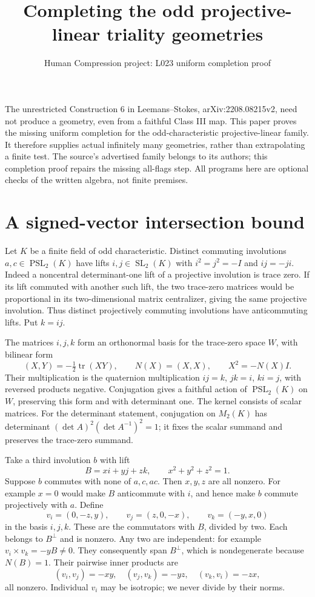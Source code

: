 \documentclass[11pt,a4paper]{article}
\title{Completing the odd projective-linear triality geometries}
\author{Human Compression project: L023 uniform completion proof}\date{}
\newcommand{\PSL}{\operatorname{PSL}}
\begin{document}
\maketitle
The unrestricted Construction 6 in Leemans--Stokes,
arXiv:2208.08215v2, need not produce a geometry, even from a faithful
Class III map. This paper proves the missing uniform completion for
the odd-characteristic projective-linear family. It therefore supplies
actual infinitely many geometries, rather than extrapolating a finite
test. The source's advertised family belongs to its authors; this
completion proof repairs the missing all-flags step. All programs here
are optional checks of the written algebra, not finite premises.

\section{A signed-vector intersection bound}
Let $K$ be a finite field of odd characteristic. Distinct commuting
involutions $a,c\in\PSL_2(K)$ have lifts $i,j\in\operatorname{SL}_2(K)$
with $i^2=j^2=-I$ and $ij=-ji$. Indeed a noncentral determinant-one
lift of a projective involution is trace zero. If its lift commuted
with another such lift, the two trace-zero matrices would be
proportional in its two-dimensional matrix centralizer, giving the
same projective involution. Thus distinct projectively commuting
involutions have anticommuting lifts. Put $k=ij$.

The matrices $i,j,k$ form an orthonormal basis for the trace-zero
space $W$, with bilinear form
\[
 (X,Y)=-\tfrac12\operatorname{tr}(XY),\qquad
 N(X)=(X,X),\qquad X^2=-N(X)I.
\]
Their multiplication is the quaternion multiplication
$ij=k$, $jk=i$, $ki=j$, with reversed products negative.
Conjugation gives a faithful action of $\PSL_2(K)$ on $W$,
preserving this form and with determinant one. The kernel consists
of scalar matrices. For the determinant statement, conjugation on
$M_2(K)$ has determinant $(\det A)^2(\det A^{-1})^2=1$;
it fixes the scalar summand and preserves the trace-zero summand.

Take a third involution $b$ with lift
\[
                 B=xi+yj+zk,\qquad x^2+y^2+z^2=1.
\]
Suppose $b$ commutes with none of $a,c,ac$. Then $x,y,z$ are
all nonzero. For example $x=0$ would make $B$ anticommute with $i$,
and hence make $b$ commute projectively with $a$. Define
\[
 v_i=(0,-z,y),\qquad v_j=(z,0,-x),\qquad v_k=(-y,x,0)
\]
in the basis $i,j,k$. These are the commutators with $B$, divided
by two. Each belongs to $B^\perp$ and is nonzero. Any two are
independent: for example $v_i\times v_k=-yB\ne0$.
They consequently span $B^\perp$, which is nondegenerate because
$N(B)=1$. Their pairwise inner products are
\[
 (v_i,v_j)=-xy,\quad(v_j,v_k)=-yz,\quad(v_k,v_i)=-zx,
\]
all nonzero. Individual $v_i$ may be isotropic; we never divide
by their norms.
\end{document}
